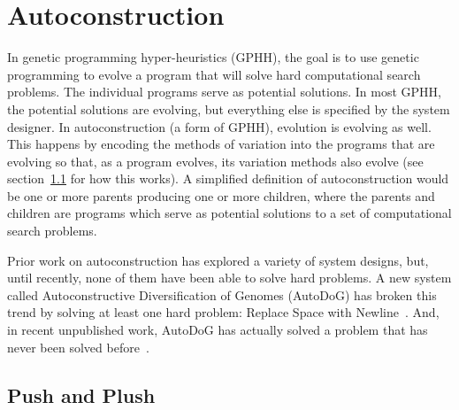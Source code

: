 \documentclass{sig-alternate}
\begin{document}
\section{Autoconstruction}
\label{sec:ac}
In genetic programming hyper-heuristics (GPHH), the goal is to use genetic programming to evolve a program that will solve hard computational search problems. The individual programs serve as potential solutions. In most GPHH, the potential solutions are evolving, but everything else is specified by the system designer.  In autoconstruction (a form of GPHH), evolution is evolving as well. This happens by encoding the methods of variation into the programs that are evolving so that, as a program evolves, its variation methods also evolve (see section~\ref{sec:push} for how this works). A simplified definition of autoconstruction would be one or more parents producing one or more children, where the parents and children are programs which serve as potential solutions to a set of computational search problems.

Prior work on autoconstruction has explored a variety of system designs, but, until recently, none of them have been able to solve hard problems. A new system called Autoconstructive Diversification of Genomes (AutoDoG) has broken this trend by solving at least one hard problem: Replace Space with Newline~\cite{spector:2016}. And, in recent unpublished work, AutoDoG has actually solved a problem that has never been solved before~\cite{eva:2017}.

\subsection{Push and Plush}
\label{sec:push}
\end{document}
